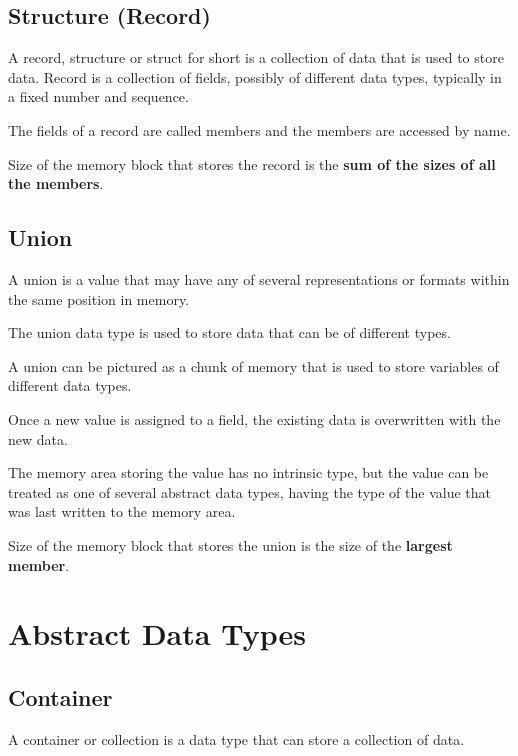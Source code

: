 \documentclass{book}
\begin{document}
\subsection{Structure (Record)}

    A record, structure or struct for short is a collection of data that is used to store data. Record is a collection of fields, possibly of different data types, typically in a fixed number and sequence.

    \noindent The fields of a record are called members and the members are accessed by name.

    \noindent Size of the memory block that stores the record is the \textbf{sum of the sizes of all the members}.

\subsection{Union}

    A union is a value that may have any of several representations or formats within the same position in memory.

    \noindent The union data type is used to store data that can be of different types. 

    \noindent A union can be pictured as a chunk of memory that is used to store variables of different data types. 
    
    \noindent Once a new value is assigned to a field, the existing data is overwritten with the new data.
    
    \noindent The memory area storing the value has no intrinsic type, but the value can be treated as one of several abstract data types, having the type of the value that was last written to the memory area.

    \noindent Size of the memory block that stores the union is the size of the \textbf{largest member}.

\section{Abstract Data Types}

\subsection{Container}

A container or collection is a data type that can store a collection of data.
\end{document}

